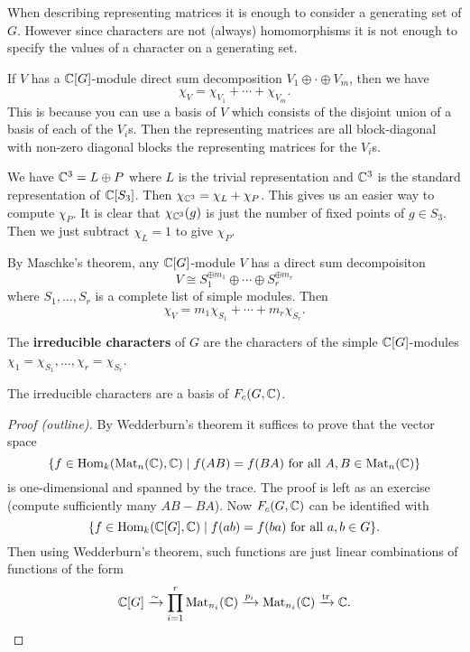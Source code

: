 \begin{rmk}
	When describing representing matrices it is enough to consider a generating set of $G$.
	However since characters are not (always) homomorphisms it is not enough to specify the values of a character on a generating set.
\end{rmk}

\begin{rmk}
	If $V$ has a $\mathbb{C}[G]$-module direct sum decomposition $V_1 \oplus \cdot \oplus V_m$, then we have
	\[\chi_V = \chi_{V_1}+\cdots+\chi_{V_m}.\]
	This is because you can use a basis of $V$ which consists of the disjoint union of a basis of each of the $V_i$s.
	Then the representing matrices are all block-diagonal with non-zero diagonal blocks the representing matrices for the $V_i$s.
\end{rmk}

\begin{exam}
	We have $\mathbb{C}^3 = L \oplus P$ where $L$ is the trivial representation and $\mathbb{C}^3$ is the standard representation of $\mathbb{C}[S_3]$.
	Then $\chi_{\mathbb{C}^3} = \chi_L+\chi_P$.
	This gives us an easier way to compute $\chi_P$.
	It is clear that $\chi_{\mathbb{C}^3}(g)$ is just the number of fixed points of $g \in S_3$.
	Then we just subtract $\chi_L=1$ to give $\chi_P$.
\end{exam}

\begin{rmk}
	By Maschke's theorem, any $\mathbb{C}[G]$-module $V$ has a direct sum decompoisiton
	\[V \cong S_1^{\oplus m_1} \oplus \cdots \oplus S_r^{\oplus m_r}\]
	where $S_1,\ldots,S_r$ is a complete list of simple modules.
	Then
	\[\chi_V = m_1\chi_{S_1} + \cdots + m_r\chi_{S_r}.\]
\end{rmk}

\begin{defn}
	The \textbf{irreducible characters} of $G$ are the characters of the simple $\mathbb{C}[G]$-modules $\chi_1 = \chi_{S_1}, \ldots, \chi_r = \chi_{S_r}$.
\end{defn}

\begin{thm}
	The irreducible characters are a basis of $F_c(G,\mathbb{C})$.
\end{thm}

\begin{proof}[Proof (outline)]
	By Wedderburn's theorem it suffices to prove that the vector space
	\[\{f \in \operatorname{Hom}_k(\operatorname{Mat}_n(\mathbb{C}),\mathbb{C}) \mid f(AB)=f(BA) \text{ for all } A,B \in \operatorname{Mat}_n(\mathbb{C})\}\]
	is one-dimensional and spanned by the trace.
	The proof is left as an exercise (compute sufficiently many $AB-BA$).
	Now $F_c(G,\mathbb{C})$ can be identified with
	\[\{f \in \operatorname{Hom}_k(\mathbb{C}[G],\mathbb{C}) \mid f(ab)=f(ba) \text{ for all } a,b \in G\}.\]
	Then using Wedderburn's theorem, such functions are just linear combinations of functions of the form
	\[\mathbb{C}[G] \xrightarrow{\sim} \prod_{i=1}^r \operatorname{Mat}_{n_i}(\mathbb{C}) \xrightarrow{p_i} \operatorname{Mat}_{n_i}(\mathbb{C}) \xrightarrow{\operatorname{tr}} \mathbb{C}. \qedhere\]
\end{proof}

